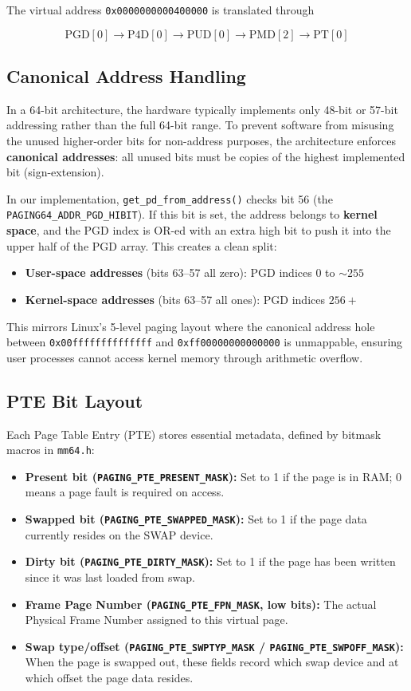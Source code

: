 The virtual address \texttt{0x0000000000400000} is translated through

\[
\mathrm{PGD}[0] \rightarrow \mathrm{P4D}[0] \rightarrow \mathrm{PUD}[0]
\rightarrow \mathrm{PMD}[2] \rightarrow \mathrm{PT}[0]
\] 

\subsection{Canonical Address Handling}
In a 64-bit architecture, the hardware typically implements only 48-bit or 57-bit addressing rather than the full 64-bit range. To prevent software from misusing the unused higher-order bits for non-address purposes, the architecture enforces \textbf{canonical addresses}: all unused bits must be copies of the highest implemented bit (sign-extension).

In our implementation, \texttt{get\_pd\_from\_address()} checks bit 56 (the \texttt{PAGING64\_ADDR\_PGD\_HIBIT}). If this bit is set, the address belongs to \textbf{kernel space}, and the PGD index is OR-ed with an extra high bit to push it into the upper half of the PGD array. This creates a clean split:
\begin{itemize}
    \item \textbf{User-space addresses} (bits 63--57 all zero): PGD indices $0$ to $\sim255$
    \item \textbf{Kernel-space addresses} (bits 63--57 all ones): PGD indices $256+$
\end{itemize}
This mirrors Linux's 5-level paging layout where the canonical address hole between \texttt{0x00ffffffffffffff} and \texttt{0xff00000000000000} is unmappable, ensuring user processes cannot access kernel memory through arithmetic overflow.

\subsection{PTE Bit Layout}
Each Page Table Entry (PTE) stores essential metadata, defined by bitmask macros in \texttt{mm64.h}:
\begin{itemize}
    \item \textbf{Present bit (\texttt{PAGING\_PTE\_PRESENT\_MASK}):} Set to 1 if the page is in RAM; 0 means a page fault is required on access.
    \item \textbf{Swapped bit (\texttt{PAGING\_PTE\_SWAPPED\_MASK}):} Set to 1 if the page data currently resides on the SWAP device.
    \item \textbf{Dirty bit (\texttt{PAGING\_PTE\_DIRTY\_MASK}):} Set to 1 if the page has been written since it was last loaded from swap.
    \item \textbf{Frame Page Number (\texttt{PAGING\_PTE\_FPN\_MASK}, low bits):} The actual Physical Frame Number assigned to this virtual page.
    \item \textbf{Swap type/offset (\texttt{PAGING\_PTE\_SWPTYP\_MASK} / \texttt{PAGING\_PTE\_SWPOFF\_MASK}):} When the page is swapped out, these fields record which swap device and at which offset the page data resides.
\end{itemize}

